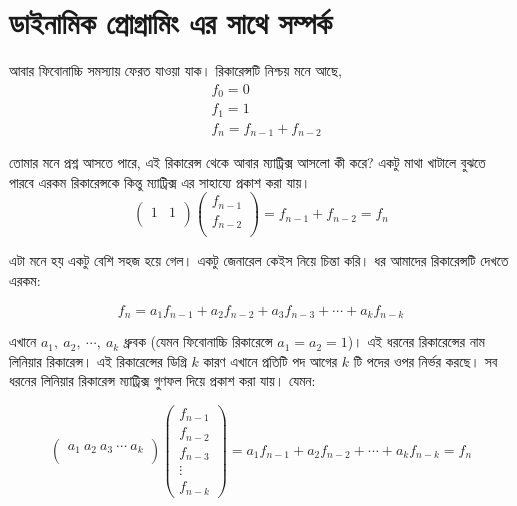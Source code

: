 \section{ডাইনামিক প্রোগ্রামিং এর সাথে সম্পর্ক}
\noindent আবার ফিবোনাচ্চি সমস্যায় ফেরত যাওয়া যাক। রিকারেন্সটি নিশ্চয় মনে আছে,
\begin{align*}
& f_{0} = 0 \\
& f_{1} = 1 \\
& f_{n} = f_{n - 1} + f_{n - 2}
\end{align*}

\noindent তোমার মনে প্রশ্ন আসতে পারে, এই রিকারেন্স থেকে আবার ম্যাট্রিক্স আসলো কী করে? একটু মাথা খাটালে বুঝতে পারবে এরকম রিকারেন্সকে কিন্তু ম্যাট্রিক্স এর সাহায্যে প্রকাশ করা যায়।
$$
\begin{pmatrix}
1 & 1\\
\end{pmatrix}
\begin{pmatrix}
f_{n - 1} \\
f_{n - 2} \\
\end{pmatrix}
= f_{n - 1} + f_{n - 2} = f_n
$$

\noindent এটা মনে হয় একটু বেশি সহজ হয়ে গেল। একটু জেনারেল কেইস নিয়ে চিন্তা করি। ধর আমাদের রিকারেন্সটি দেখতে এরকম:

\begin{equation}
  \label{linreq:1}
  f_{n} = a_1 f_{n - 1} + a_2 f_{n - 2} + a_3 f_{n - 3} + \cdots + a_k f_{n - k}
\end{equation}


\noindent এখানে $a_1, \ a_2, \ \cdots, \ a_k$ ধ্রুবক (যেমন ফিবোনাচ্চি রিকারেন্সে $a_1 = a_2 = 1$)। এই ধরনের রিকারেন্সের নাম লিনিয়ার রিকারেন্স। এই রিকারেন্সের ডিগ্রি $k$ কারণ এখানে প্রতিটি পদ আগের $k$ টি পদের ওপর নির্ভর করছে। সব ধরনের লিনিয়ার রিকারেন্স ম্যাট্রিক্স গুণফল দিয়ে প্রকাশ করা যায়। যেমন:

\begin{equation}
\begin{pmatrix}
a_1 \ a_2 \ a_3 \ \cdots \ a_k \\
\end{pmatrix}
\begin{pmatrix}
f_{n - 1} \\
f_{n - 2} \\
f_{n - 3} \\
\vdots \\
f_{n - k}
\end{pmatrix}
= a_1 f_{n - 1} + a_2 f_{n - 2} + \cdots + a_k f_{n - k} = f_n
\end{equation}

